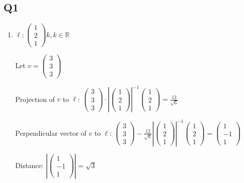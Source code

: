 \documentclass{article}
\newcommand{\abs}[1]{\left| #1 \right|}
\newcommand{\R}{\mathbb{R}}
\begin{document}
\subsection*{Q1}
\begin{enumerate}[label=(\alph*)]
\item
$\ell: \begin{pmatrix}
1\\2\\1
\end{pmatrix}
k, k \in \R
$

Let $v = \begin{pmatrix}
3\\3\\3
\end{pmatrix}$

Projection of $v$ to $\ell$: $\begin{pmatrix}
3\\3\\3
\end{pmatrix}\cdot \abs{\begin{pmatrix}
1\\2\\1
\end{pmatrix}}^{-1}\begin{pmatrix}
1\\2\\1
\end{pmatrix}
= \frac{12}{\sqrt{6}}
$

Perpendicular vector of $v$ to $\ell$: $\begin{pmatrix}
3\\3\\3
\end{pmatrix} - \frac{12}{\sqrt{6}} \abs{\begin{pmatrix}
1\\2\\1
\end{pmatrix}}^{-1}\begin{pmatrix}
1\\2\\1
\end{pmatrix}
= \begin{pmatrix}
1\\-1\\1
\end{pmatrix}
$

Distance: $\abs{\begin{pmatrix}
1\\-1\\1
\end{pmatrix}} = \sqrt{3}$


\end{enumerate}
\end{document}
